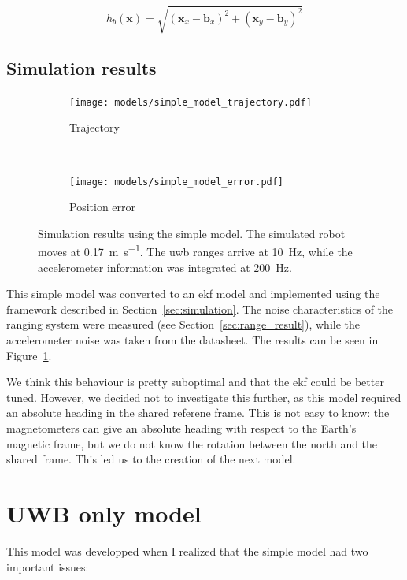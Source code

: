 \documentclass[a4paper, 12pt]{scrreprt}
\begin{document}
\begin{equation}
    h_b(\mathbf{x}) = \sqrt{\left(\mathbf{x}_x - \mathbf{b}_x\right)^2 + \left(\mathbf{x}_y - \mathbf{b}_y\right)^2}
\end{equation}

\subsection{Simulation results}

\begin{figure}[h!]
    \centering
    \begin{subfigure}[t]{0.4\textwidth}
        \texttt{[image: models/simple\_model\_trajectory.pdf]}
        \caption{Trajectory}
    \end{subfigure}%
    ~
    \begin{subfigure}[t]{0.4\textwidth}
        \texttt{[image: models/simple\_model\_error.pdf]}
        \caption{Position error}
    \end{subfigure}
    \caption{Simulation results using the simple model.
        The simulated robot moves at \SI{0.17}{\meter\per\second}.
        The \gls{uwb} ranges arrive at \SI{10}{\hertz}, while the accelerometer information was integrated at \SI{200}{\hertz}.
        \label{fig:simple_model}
    }
\end{figure}

This simple model was converted to an \gls{ekf} model and implemented using the framework described in Section~\ref{sec:simulation}.
The noise characteristics of the ranging system were measured (see Section~\ref{sec:range_result}), while the accelerometer noise was taken from the datasheet.
The results can be seen in Figure~\ref{fig:simple_model}.

We think this behaviour is pretty suboptimal and that the \gls{ekf} could be better tuned.
However, we decided not to investigate this further, as this model required an absolute heading in the shared referene frame.
This is not easy to know: the magnetometers can give an absolute heading with respect to the Earth's magnetic frame, but we do not know the rotation between the north and the shared frame.
This led us to the creation of the next model.

\section{UWB only model}

This model was developped when I realized that the simple model had two important issues:
\end{document}
